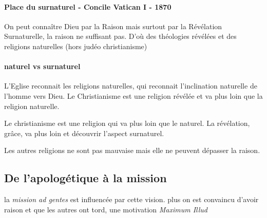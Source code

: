 \paragraph{Place du surnaturel - Concile Vatican I - 1870} On peut connaître Dieu par la Raison mais surtout par la Révélation Surnaturelle, la raison ne suffisant pas. D'où des théologies révélées et des religions naturelles (hors judéo christianisme)

\paragraph{naturel vs surnaturel} L'Eglise reconnait les religions naturelles, qui reconnait l'inclination naturelle de l'homme vers Dieu. Le Christianisme est une religion révélée et va plus loin que la religion naturelle.
\begin{Def}[Surnaturel]
Le christianisme est une religion qui va plus loin que le naturel.
La révélation, grâce, va plus loin et découvrir l'aspect surnaturel. 
\end{Def}
Les autres religions ne sont pas mauvaise mais elle ne peuvent dépasser la raison. 
\subsection{De l’apologétique à la mission}


la \textit{mission ad gentes} est influencée par cette vision. plus on est convaincu d'avoir raison et que les autres ont tord, une motivation
\textit{Maximum Illud} 

